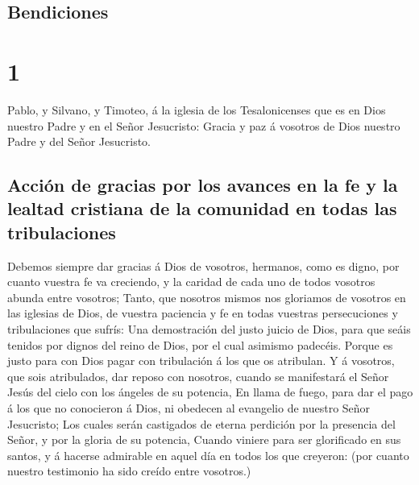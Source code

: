 \hypertarget{bendiciones}{%
\subsection{Bendiciones}\label{bendiciones}}

\hypertarget{section-53-1}{%
\section{1}\label{section-53-1}}

 Pablo, y Silvano, y Timoteo, á la iglesia de los
Tesalonicenses que es en Dios nuestro Padre y en el Señor Jesucristo:
 Gracia y paz á vosotros de Dios nuestro Padre y del Señor
Jesucristo.

\hypertarget{acciuxf3n-de-gracias-por-los-avances-en-la-fe-y-la-lealtad-cristiana-de-la-comunidad-en-todas-las-tribulaciones}{%
\subsection{Acción de gracias por los avances en la fe y la lealtad
cristiana de la comunidad en todas las
tribulaciones}\label{acciuxf3n-de-gracias-por-los-avances-en-la-fe-y-la-lealtad-cristiana-de-la-comunidad-en-todas-las-tribulaciones}}

 Debemos siempre dar gracias á Dios de vosotros, hermanos,
como es digno, por cuanto vuestra fe va creciendo, y la caridad de cada
uno de todos vosotros abunda entre vosotros;  Tanto, que
nosotros mismos nos gloriamos de vosotros en las iglesias de Dios, de
vuestra paciencia y fe en todas vuestras persecuciones y tribulaciones
que sufrís:  Una demostración del justo juicio de Dios,
para que seáis tenidos por dignos del reino de Dios, por el cual
asimismo padecéis.  Porque es justo para con Dios pagar
con tribulación á los que os atribulan.  Y á vosotros, que
sois atribulados, dar reposo con nosotros, cuando se manifestará el
Señor Jesús del cielo con los ángeles de su potencia,  En
llama de fuego, para dar el pago á los que no conocieron á Dios, ni
obedecen al evangelio de nuestro Señor Jesucristo;  Los
cuales serán castigados de eterna perdición por la presencia del Señor,
y por la gloria de su potencia,  Cuando viniere para ser
glorificado en sus santos, y á hacerse admirable en aquel día en todos
los que creyeron: (por cuanto nuestro testimonio ha sido creído entre
vosotros.)

